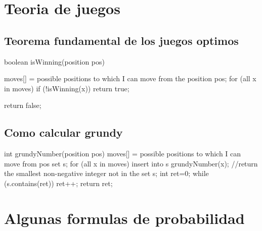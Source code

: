 

\section{Teoria de juegos}
\subsection{Teorema fundamental de los juegos optimos}
\begin{code}
boolean isWinning(position pos) {
    moves[] = possible positions to which I can move from the position pos;
    for (all x in moves) 
        if (!isWinning(x)) return true;
    
    return false; 
}
\end{code}
\subsection{Como calcular grundy}
\begin{code}
int grundyNumber(position pos) {
    moves[] = possible positions to which I can move from pos
    set s;
    for (all x in moves) insert into s grundyNumber(x);
    //return the smallest non-negative integer not in the set s;    
    int ret=0;
    while (s.contains(ret)) ret++;
    return ret;
}
\end{code}

\section{Algunas formulas de probabilidad}
